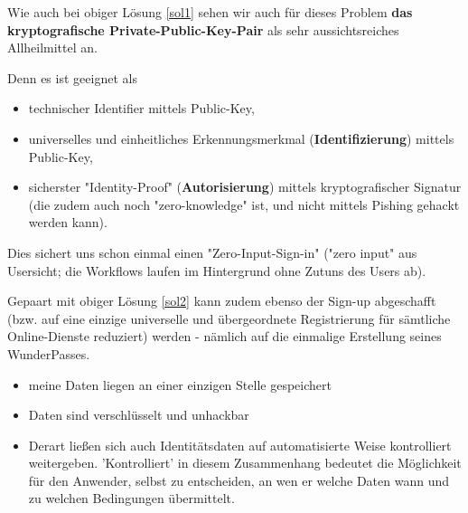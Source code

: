 \vspace{0.3cm}


\begin{Solution}[mangelhafte UX]

Wie auch bei obiger Lösung \ref{sol1} sehen wir auch für dieses Problem \textbf{das kryptografische Private-Public-Key-Pair} als sehr aussichtsreiches Allheilmittel an.

Denn es ist geeignet als 

\begin{itemize}
  \item	technischer Identifier mittels Public-Key,
  \item universelles und einheitliches Erkennungsmerkmal (\textbf{Identifizierung}) mittels Public-Key,
  \item sicherster "Identity-Proof" (\textbf{Autorisierung}) mittels kryptografischer Signatur (die zudem auch noch "zero-knowledge" ist, und nicht mittels Pishing gehackt werden kann).
\end{itemize}

Dies sichert uns schon einmal einen "Zero-Input-Sign-in" ("zero input" aus Usersicht; die Workflows laufen im Hintergrund ohne Zutuns des Users ab).

\vspace{0.1cm}

Gepaart mit obiger Lösung \ref{sol2} kann zudem ebenso der Sign-up abgeschafft (bzw. auf eine einzige universelle und übergeordnete Registrierung für sämtliche Online-Dienste reduziert) werden - nämlich auf die einmalige Erstellung seines WunderPasses.

\end{Solution}

\vspace{0.3cm}


\begin{Solution}[Datenschutz]

\begin{itemize}
  \item meine Daten liegen an einer einzigen Stelle gespeichert
  \item Daten sind verschlüsselt und unhackbar
  \item Derart ließen sich auch Identitätsdaten auf automatisierte Weise kontrolliert weitergeben. 'Kontrolliert' in diesem Zusammenhang bedeutet die Möglichkeit für den Anwender, selbst zu entscheiden, an wen er welche Daten wann und zu welchen Bedingungen übermittelt.
\end{itemize}

\end{Solution}

